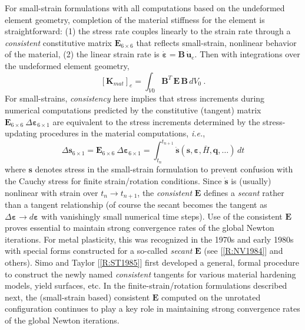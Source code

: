 \documentclass[11pt]{report}
\numberwithin{equation}{section}
\newcommand{\bmf } {\boldsymbol }  %
\newcommand{\ie}{\emph{i.e.},\xspace}
\newcommand{\ti}{\emph}
\newcommand{\nid}{\noindent}
\newcommand{\vareps}{\varepsilon}
\begin{document}
For small-strain formulations with all computations based on the undeformed element 
geometry, completion of the material stiffness for the element is straightforward:
(1) the stress rate couples linearly to the strain rate through 
a \ti{consistent} constitutive matrix $\mathbf{E}_{6 \times 6}$ that reflects small-strain, nonlinear behavior of the material,
(2) the linear strain rate is $\dot{\bmf{\vareps}} = \mathbf{B} \,\dot{\bmf{u}}_e$. Then with
integrations over the undeformed element geometry,
%
\begin{equation}\label{E:SRCTb}
 \left [ \mathbf{K}_{mat} \right ]_e =  
 \int_{V0} \mathbf{B}^T\, \mathbf{E}\, \mathbf{B} \, dV_0\ .
\end{equation}
%
\nid For small-strains, \ti{consistency} here
implies that stress increments during numerical computations 
predicted by the constitutive (tangent) matrix 
$\mathbf{E}_{6 \times 6}\ \Delta \bmf{\vareps}_{6 \times 1}$ are equivalent to the 
stress increments determined by the stress-updating procedures in the material computations, \ie
%
\begin{equation}\label{E:SRCTc}
 \Delta \bmf{s}_{6 \times 1} = \mathbf{E}_{6 \times 6}\ \Delta \bmf{\vareps}_{6 \times 1}
=\int_{t_n}^{t_{n+1}} \dot{\bmf{s}}(\bmf{s},\bmf{\vareps}, \bar H, \mathbf{q},\dots) \, dt
\end{equation}
%
\nid where $\bmf{s}$ denotes stress in the small-strain formulation to prevent confusion with the
Cauchy stress for finite strain/rotation conditions. Since $\dot{\bmf{s}}$ is (usually) nonlinear with
strain over $t_n \rightarrow t_{n+1}$, the \ti{consistent} $\mathbf{E}$ defines a \ti{secant} rather
than a tangent relationship (of course the secant becomes the tangent as $\Delta \bmf{\vareps}
\rightarrow d\bmf{\vareps}$ with vanishingly small numerical time steps). Use of the consistent
$\mathbf{E}$ proves essential to maintain strong convergence rates of the global Newton iterations.
For metal plasticity, this was recognized in the 1970s and early 1980s with special forms constructed
for a so-called \ti{secant}  $\mathbf{E}$ (see [\ref{R:NV1984}] and others).
Simo and Taylor [\ref{R:ST1985}]
first developed a general, formal procedure to construct the newly named \ti{consistent} tangents for 
various material hardening models, yield surfaces, etc. In the finite-strain/rotation formulations
described next, the (small-strain based) consistent $\mathbf{E}$ computed on the unrotated
configuration continues to play a 
key role in maintaining strong convergence rates of the global Newton iterations.
\end{document}
